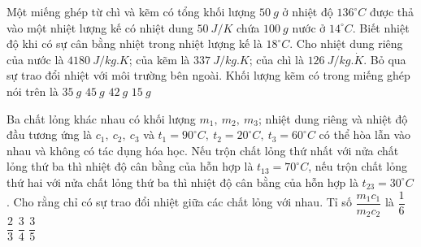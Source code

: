 \begin{ex} 
	Một miếng ghép từ chì và kẽm có tổng khối lượng $50 \ g$ ở nhiệt độ $136^\circ C$ được thả vào một nhiệt lượng kế có nhiệt dung $50 \ J / K$ chứa $100 \ g$ nước ở $14^\circ C$. Biết nhiệt độ khi có sự cân bằng nhiệt trong nhiệt lượng kế là $18^\circ C$. Cho nhiệt dung riêng của nước là $4180 \ J/kg. K$; của kẽm là $337 \ J/kg. K$; của chì là $126 \ J / kg. \dot{K}$. Bỏ qua sự trao đổi nhiệt với môi trường bên ngoài. Khối lượng kẽm có trong miếng ghép nói trên là
	\choice
	{$35 \ g$}
	{\True $45 \ g$}
	{$42 \ g$}
	{$15 \ g$}
\end{ex}
\begin{ex} 
	Ba chất lỏng khác nhau có khối lượng $m_1, \ m_2, \ m_3$; nhiệt dung riêng và nhiệt độ đầu tương ứng là $c_1,\ c_2,\ c_3$ và $t_1=90^\circ C,\ t_2=20^\circ C,\ t_3=60^\circ C$ có thể hòa lẫn vào nhau và không có tác dụng hóa học. Nếu trộn chất lỏng thứ nhất với nửa chất lỏng thứ ba thì nhiệt độ cân bằng của hỗn hợp là $t_{13}=70^\circ C$, nếu trộn chất lỏng thứ hai với nửa chất lỏng thứ ba thì nhiệt độ cân bằng của hỗn hợp là $t_{23}=30^\circ C$. Cho rằng chỉ có sự trao đổi nhiệt giữa các chất lỏng với nhau. Tỉ số $\dfrac{m_1c_1}{m_2c_2}$ là
	\choice
	{\True $\dfrac{1}{6}$}
	{$\dfrac{2}{3}$}
	{$\dfrac{3}{4}$}
	{$\dfrac{3}{5}$}
\end{ex}
